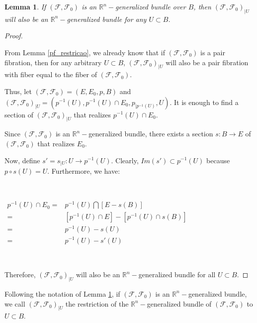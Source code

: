 \documentclass[12pt,oneside]{book}
\newtheorem{lem}    {Lemma}[chapter]
\newcommand{\R}{\mathbb{R}}
\begin{document}
    \begin{lem}\label{fht_restricao}
        If $(\mathcal{F},\mathcal{F}_{0})$ is an $\R^{n}-$generalized bundle over $B$, then 
        $(\mathcal{F},\mathcal{F}_{0})_{|U}$ will also be an $\R^{n}-$generalized bundle for any $U\subset B$.
    \end{lem}
    \begin{proof}
        
        \
    
        From Lemma \ref{pf_restricao}, we already know that if $(\mathcal{F},\mathcal{F}_{0})$ is a pair fibration, 
        then for any arbitrary $U\subset B$, $(\mathcal{F},\mathcal{F}_{0})_{|U}$ will also be a pair fibration with fiber equal to the fiber 
        of $(\mathcal{F},\mathcal{F}_{0})$.
        
        Thus, let $(\mathcal{F},\mathcal{F}_{0})=(E,E_{0},p,B)$ and 
        $(\mathcal{F},\mathcal{F}_{0})_{|U}=(p^{-1}(U),p^{-1}(U)\cap E_{0},p_{|p^{-1}(U)},U)$. It is enough to find a 
        section of $(\mathcal{F},\mathcal{F}_{0})_{|U}$ that realizes $p^{-1}(U)\cap E_{0}$.
    
        Since $(\mathcal{F},\mathcal{F}_{0})$ is an $\R^{n}-$generalized bundle, there exists a section $s:B\to E$ of 
        $(\mathcal{F},\mathcal{F}_{0})$ that realizes $E_{0}$.
        
        Now, define $s'=s_{|U}:U\to p^{-1}(U)$. Clearly, $Im(s')\subset p^{-1}(U)$ because $p\circ s(U)=U$. Furthermore, we have:

        \
    
        $\begin{array}{rl}
            p^{-1}(U)\cap E_{0} = & p^{-1}(U)\bigcap [E-s(B)] \\
            = & [p^{-1}(U)\cap E]-[p^{-1}(U)\cap s(B)] \\
            = & p^{-1}(U)-s(U) \\
            = & p^{-1}(U)-s'(U)
        \end{array}$

        \
    
        Therefore, $(\mathcal{F},\mathcal{F}_{0})_{|U}$ will also be an $\R^{n}-$generalized bundle for all $U\subset B$.
    
    \end{proof}
    
    Following the notation of Lemma \ref{fht_restricao}, if $(\mathcal{F},\mathcal{F}_{0})$ is an $\R^{n}-$generalized bundle, we call 
    $(\mathcal{F},\mathcal{F}_{0})_{|U}$ the restriction of the $\R^{n}-$generalized bundle of 
    $(\mathcal{F},\mathcal{F}_{0})$ to $U\subset B$.
    
\end{document}
